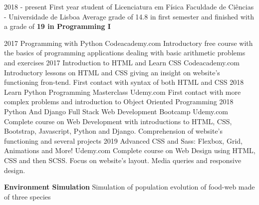 \documentclass[9pt]{developercv} %
\begin{document}

\begin{entrylist}
	\entry
			{2018 - present}
		{First year student of Licenciatura em Física}
		{Faculdade de Ciências - Universidade de Lisboa}
		{Average grade of 14.8 in first semester and finished with a grade of \textbf{19 in Programming I}}
\end{entrylist}

\begin{entrylist}
	\entry
		{2017}
		{Programming with Python}
		{Codeacademy.com}
		{Introductory free course with the basics of programming applications dealing with basic arithmetic problems and exercises}
	\entry
		{2017}
		{Introduction to HTML and Learn CSS}
		{Codeacademy.com}
		{Introductory lessons on HTML and CSS giving an insight on website's functioning fron-tend. First contact with syntax of both HTML and CSS}
	\entry
		{2018}
		{Learn Python Programming Masterclass}
		{Udemy.com}
		{First contact with more complex problems and introduction to Object Oriented Programming}
	\entry
		{2018}
		{Python And Django Full Stack Web Development Bootcamp}
		{Udemy.com}
		{Complete course on Web Development with introductions to HTML, CSS, Bootstrap, Javascript, Python and Django. Comprehension of website's functioning and several projects}
	\entry
		{2019}
		{Advanced CSS and Sass: Flexbox, Grid, Animations and More!}
		{Udemy.com}
		{Complete course on Web Design using HTML, CSS and then SCSS. Focus on website's layout. Media queries and responsive design.}
\end{entrylist}


\begin{description}
	\item \textbf{Environment Simulation} \quad Simulation of population evolution of food-web made of three species
\end{description}
\end{document}
